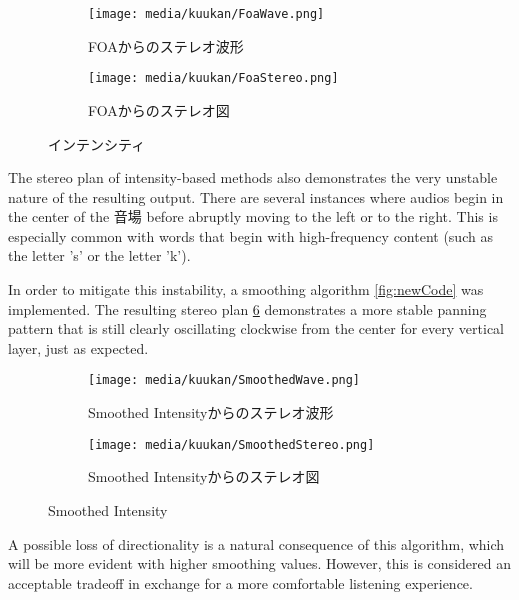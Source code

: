 \documentclass[a4paper, 12pt]{article}
\begin{document}
\begin{figure}
\centering
\begin{subfigure}{1.0\textwidth}
  \centering
  \texttt{[image: media/kuukan/FoaWave.png]}
  \caption{FOAからのステレオ波形}
  \label{fig:ambWave}
\end{subfigure}
\vspace{5mm}
\begin{subfigure}{1.0\textwidth}
  \centering
  \texttt{[image: media/kuukan/FoaStereo.png]}
  \caption{FOAからのステレオ図}
  \label{fig:ambSte}
\end{subfigure}
\caption{インテンシティ}
\label{fig:amb}
\end{figure}

The stereo plan of intensity-based methods also demonstrates the very unstable nature of the resulting output. There are several instances where audios begin in the center of the 音場 before abruptly moving to the left or to the right. This is especially common with words that begin with high-frequency content (such as the letter 's' or the letter 'k').

In order to mitigate this instability, a smoothing algorithm \ref{fig:newCode} was implemented. The resulting stereo plan \ref{fig:smoothed} demonstrates a more stable panning pattern that is still clearly oscillating clockwise from the center for every vertical layer, just as expected.

\begin{figure}
\centering
\begin{subfigure}{1.0\textwidth}
  \centering
  \texttt{[image: media/kuukan/SmoothedWave.png]}
  \caption{Smoothed Intensityからのステレオ波形}
  \label{fig:smoWave}
\end{subfigure}
\vspace{5mm}
\begin{subfigure}{1.0\textwidth}
  \centering
  \texttt{[image: media/kuukan/SmoothedStereo.png]}
  \caption{Smoothed Intensityからのステレオ図}
  \label{fig:smoSte}
\end{subfigure}
\caption{Smoothed Intensity}
\label{fig:smoothed}
\end{figure}

A possible loss of directionality is a natural consequence of this algorithm, which will be more evident with higher smoothing values. However, this is considered an acceptable tradeoff in exchange for a more comfortable listening experience.
\end{document}
